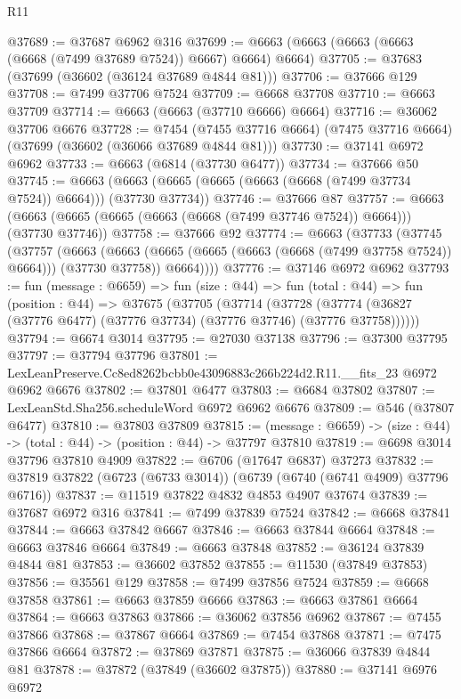 \begin{lexlean}{R11}
\begin{coremodule}
@37689 := @37687 @6962 @316
@37699 := @6663 (@6663 (@6663 (@6663 (@6668 (@7499 @37689 @7524)) @6667) @6664) @6664)
@37705 := @37683 (@37699 (@36602 (@36124 @37689 @4844 @81)))
@37706 := @37666 @129
@37708 := @7499 @37706 @7524
@37709 := @6668 @37708
@37710 := @6663 @37709
@37714 := @6663 (@6663 (@37710 @6666) @6664)
@37716 := @36062 @37706 @6676
@37728 := @7454
    (@7455 @37716 @6664)
    (@7475 @37716 @6664)
    (@37699 (@36602 (@36066 @37689 @4844 @81)))
@37730 := @37141 @6972 @6962
@37733 := @6663 (@6814 (@37730 @6477))
@37734 := @37666 @50
@37745 := @6663 (@6663 (@6665 (@6665 (@6663 (@6668 (@7499 @37734 @7524)) @6664))) (@37730 @37734))
@37746 := @37666 @87
@37757 := @6663 (@6663 (@6665 (@6665 (@6663 (@6668 (@7499 @37746 @7524)) @6664))) (@37730 @37746))
@37758 := @37666 @92
@37774 := @6663
    (@37733
      (@37745
        (@37757
          (@6663
            (@6663 (@6665 (@6665 (@6663 (@6668 (@7499 @37758 @7524)) @6664))) (@37730 @37758))
            @6664))))
@37776 := @37146 @6972 @6962
@37793 := fun (message : @6659) =>
  fun (size : @44) =>
  fun (total : @44) =>
  fun (position : @44) =>
  @37675
    (@37705
      (@37714
        (@37728 (@37774 (@36827 (@37776 @6477) (@37776 @37734) (@37776 @37746) (@37776 @37758))))))
@37794 := @6674 @3014
@37795 := @27030 @37138
@37796 := @37300 @37795
@37797 := @37794 @37796
@37801 := LexLeanPreserve.Cc8ed8262bcbb0e43096883c266b224d2.R11.__fits_23 @6972 @6962 @6676
@37802 := @37801 @6477
@37803 := @6684 @37802
@37807 := LexLeanStd.Sha256.scheduleWord @6972 @6962 @6676
@37809 := @546 (@37807 @6477)
@37810 := @37803 @37809
@37815 := (message : @6659) -> (size : @44) -> (total : @44) -> (position : @44) -> @37797 @37810
@37819 := @6698 @3014 @37796 @37810 @4909
@37822 := @6706 (@17647 @6837) @37273
@37832 := @37819 @37822 (@6723 (@6733 @3014)) (@6739 (@6740 (@6741 @4909) @37796 @6716))
@37837 := @11519 @37822 @4832 @4853 @4907 @37674
@37839 := @37687 @6972 @316
@37841 := @7499 @37839 @7524
@37842 := @6668 @37841
@37844 := @6663 @37842 @6667
@37846 := @6663 @37844 @6664
@37848 := @6663 @37846 @6664
@37849 := @6663 @37848
@37852 := @36124 @37839 @4844 @81
@37853 := @36602 @37852
@37855 := @11530 (@37849 @37853)
@37856 := @35561 @129
@37858 := @7499 @37856 @7524
@37859 := @6668 @37858
@37861 := @6663 @37859 @6666
@37863 := @6663 @37861 @6664
@37864 := @6663 @37863
@37866 := @36062 @37856 @6962
@37867 := @7455 @37866
@37868 := @37867 @6664
@37869 := @7454 @37868
@37871 := @7475 @37866 @6664
@37872 := @37869 @37871
@37875 := @36066 @37839 @4844 @81
@37878 := @37872 (@37849 (@36602 @37875))
@37880 := @37141 @6976 @6972

\end{coremodule}
\end{lexlean}
